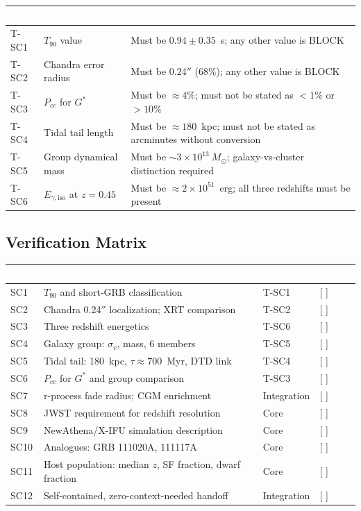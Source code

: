 \documentclass[11pt,letterpaper]{article}
\newcommand{\tableheader}[1]{\textbf{\sffamily\textcolor{white}{#1}}}
\begin{document}
\begin{center}
\begin{tabularx}{\textwidth}{C{1cm}L{4cm}X}
\toprule
{}
\tableheader{ID} & \tableheader{Verifies} & \tableheader{Expected outcome / BLOCK condition} \\
\midrule
T-SC1 & $T_{90}$ value & Must be $0.94 \pm 0.35$~s; any other value is BLOCK \\
T-SC2 & Chandra error radius & Must be 0.24$''$ (68\%); any other value is BLOCK \\
T-SC3 & $P_{cc}$ for $G^*$ & Must be $\approx 4\%$; must not be stated as $<1\%$ or $>10\%$ \\
T-SC4 & Tidal tail length & Must be $\approx 180$~kpc; must not be stated as arcminutes without conversion \\
T-SC5 & Group dynamical mass & Must be $\sim 3 \times 10^{13}~M_\odot$; galaxy-vs-cluster distinction required \\
T-SC6 & $E_{\gamma,\text{iso}}$ at $z=0.45$ & Must be $\approx 2 \times 10^{51}$~erg; all three redshifts must be present \\
\bottomrule
\end{tabularx}
\end{center}

\subsection{Verification Matrix}

\begin{center}
\begin{tabularx}{\textwidth}{C{1cm}L{5cm}C{2.5cm}C{2cm}}
\toprule
{}
\tableheader{SC\#} & \tableheader{Criterion} & \tableheader{Test IDs} & \tableheader{Status} \\
\midrule
SC1 & $T_{90}$ and short-GRB classification & T-SC1 & [ ] \\
SC2 & Chandra 0.24$''$ localization; XRT comparison & T-SC2 & [ ] \\
SC3 & Three redshift energetics & T-SC6 & [ ] \\
SC4 & Galaxy group: $\sigma_v$, mass, 6 members & T-SC5 & [ ] \\
SC5 & Tidal tail: 180~kpc, $\tau \approx 700$~Myr, DTD link & T-SC4 & [ ] \\
SC6 & $P_{cc}$ for $G^*$ and group comparison & T-SC3 & [ ] \\
SC7 & r-process fade radius; CGM enrichment & Integration & [ ] \\
SC8 & JWST requirement for redshift resolution & Core & [ ] \\
SC9 & NewAthena/X-IFU simulation description & Core & [ ] \\
SC10 & Analogues: GRB 111020A, 111117A & Core & [ ] \\
SC11 & Host population: median $z$, SF fraction, dwarf fraction & Core & [ ] \\
SC12 & Self-contained, zero-context-needed handoff & Integration & [ ] \\
\bottomrule
\end{tabularx}
\end{center}
\end{document}
